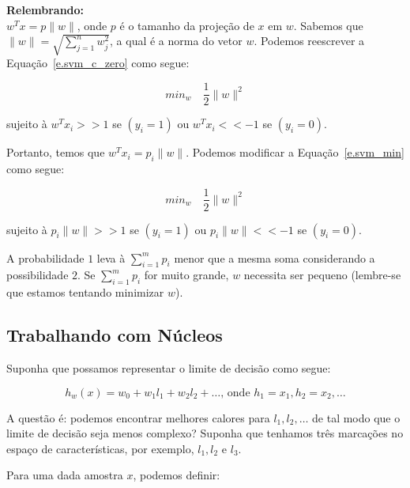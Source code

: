 \textbf{Relembrando:}\\

$w^Tx = p \parallel w \parallel$, onde $p$ é o tamanho da projeção de $x$ em $w$. Sabemos que $\parallel w \parallel = \sqrt{\sum\limits_{j=1}^n w_j^2}$, a qual é a norma do vetor $w$. Podemos reescrever a Equação~\ref{e.svm_c_zero} como segue:

\begin{equation}
\label{e.svm_min}
min_w \quad \frac{1}{2} \parallel w \parallel^2
\end{equation}
\begin{center}
sujeito à $w^Tx_i >> 1$ se $(y_i = 1)$ ou $w^Tx_i << -1$ se $(y_i = 0)$.
\end{center}

Portanto, temos que $w^Tx_i = p_i \parallel w \parallel$. Podemos modificar a Equação~\ref{e.svm_min} como segue:

\begin{equation}
min_w \quad \frac{1}{2} \parallel w \parallel^2	
\end{equation}
\begin{center}
sujeito à $p_i \parallel w \parallel >> 1$ se $(y_i = 1)$ ou $p_i \parallel w \parallel << -1$ se $(y_i = 0)$.
\end{center}

A probabilidade $1$ leva à $\sum\limits_{i=1}^m p_i$ menor que a mesma soma considerando a possibilidade  $2$. Se $\sum\limits_{i=1}^m p_i$ for muito grande, $w$ necessita ser pequeno (lembre-se que estamos tentando minimizar $w$).

\subsection{Trabalhando com Núcleos}
\label{ss.svm_kernels}

Suponha que possamos representar o limite de decisão como segue:

\begin{equation}
\label{e.boundary_limit}
h_w(x) = w_0 + w_1l_1 + w_2l_2 + \dots\text{, onde } h_1 = x_1, h_2 = x_2, \dots
\end{equation}

A questão é: podemos encontrar melhores calores para $l_1, l_2, \dots$ de tal modo que o limite de decisão seja menos complexo? Suponha que tenhamos três marcações no espaço de características, por exemplo, $l_1, l_2$ e $l_3$. 

Para uma dada amostra $x$, podemos definir:

